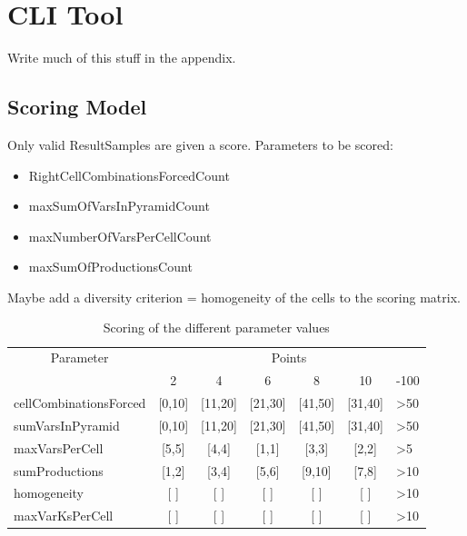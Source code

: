 
\section{CLI Tool}
Write much of this stuff in the appendix.

\subsection{Scoring Model} \label{scoringModel}

Only valid ResultSamples are given a score. Parameters to be scored:
\begin{itemize}
	\item RightCellCombinationsForcedCount
	\item maxSumOfVarsInPyramidCount 	
	\item maxNumberOfVarsPerCellCount
	\item maxSumOfProductionsCount
\end{itemize}

\noindent Maybe add a diversity criterion = homogeneity of the cells to the scoring matrix.

\begin{table}[H]
	\centering
	\begin{tabular}{|l|c|c|c|c|c|l|}
		\hline
		\multicolumn{1}{|c|}{\multirow{2}{*}{Parameter}} & \multicolumn{6}{c|}{Points}                                                          \\ \cline{2-7} 
		\multicolumn{1}{|c|}{}		& 2          & 4           & 6           & 8           & 10          & -100            \\ \hline
		cellCombinationsForced      & {[}0,10{]} & {[}11,20{]} & {[}21,30{]} & {[}41,50{]} & {[}31,40{]} & \textgreater 50 \\ \hline
		sumVarsInPyramid            & {[}0,10{]} & {[}11,20{]} & {[}21,30{]} & {[}41,50{]} & {[}31,40{]} & \textgreater 50 \\ \hline
		maxVarsPerCell              & {[}5,5{]}  & {[}4,4{]}   & {[}1,1{]}   & {[}3,3{]}   & {[}2,2{]}   & \textgreater 5  \\ \hline
		sumProductions              & {[}1,2{]}  & {[}3,4{]}   & {[}5,6{]}   & {[}9,10{]}  & {[}7,8{]}   & \textgreater 10 \\ \hline
		homogeneity 				& {[} {]}  & {[} {]}   & {[} {]}   & {[} {]}  & {[} {]}   & \textgreater 10 \\ \hline
		maxVarKsPerCell 			& {[} {]}  & {[} {]}   & {[} {]}   & {[} {]}  & {[} {]}   & \textgreater 10 \\ \hline
	\end{tabular}
	\caption{Scoring of the different parameter values}
	\label{scoring}
\end{table}



